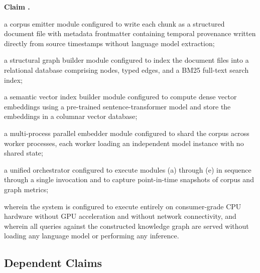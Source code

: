 \documentclass[12pt,letterpaper]{article}
\newcounter{claimnum}
\newenvironment{claims}
  {\begin{list}{\textbf{Claim \arabic{claimnum}.}}
      {\usecounter{claimnum}
       \setlength{\labelwidth}{1.8cm}
       \setlength{\labelsep}{0.4cm}
       \setlength{\leftmargin}{2.2cm}
       \setlength{\itemsep}{12pt}
       \setlength{\parsep}{4pt}}}
  {\end{list}}
\begin{document}
\begin{claims}
\begin{claimelems}
  \item a corpus emitter module configured to write each chunk as a structured document
        file with metadata frontmatter containing temporal provenance written directly
        from source timestamps without language model extraction;

  \item a structural graph builder module configured to index the document files into a
        relational database comprising nodes, typed edges, and a BM25 full-text search
        index;

  \item a semantic vector index builder module configured to compute dense vector
        embeddings using a pre-trained sentence-transformer model and store the
        embeddings in a columnar vector database;

  \item a multi-process parallel embedder module configured to shard the corpus across
        worker processes, each worker loading an independent model instance with no
        shared state;

  \item a unified orchestrator configured to execute modules (a) through (e) in
        sequence through a single invocation and to capture point-in-time snapshots of
        corpus and graph metrics;
\end{claimelems}

\noindent wherein the system is configured to execute entirely on consumer-grade CPU
hardware without GPU acceleration and without network connectivity, and wherein all
queries against the constructed knowledge graph are served without loading any language
model or performing any inference.

\end{claims}

\subsection*{Dependent Claims}
\end{document}
